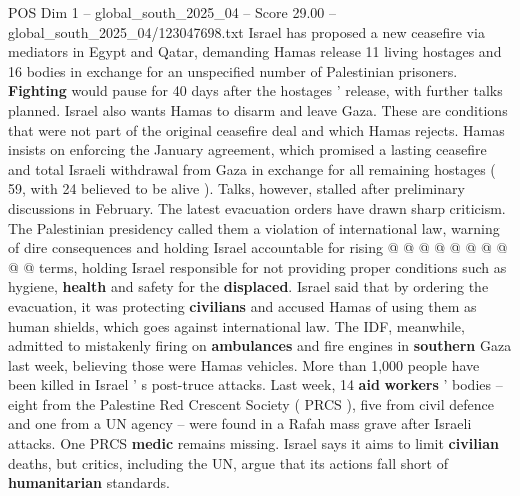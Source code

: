 \begin{textsample}{POS Dim 1 – global\_south\_2025\_04 – Score 29.00 – global\_south\_2025\_04/123047698.txt}
Israel has proposed a new ceasefire via mediators in Egypt and Qatar, demanding Hamas release 11 living hostages and 16 bodies in exchange for an unspecified number of Palestinian prisoners. \textbf{Fighting} would pause for 40 days after the hostages ' release, with further talks planned.
Israel also wants Hamas to disarm and leave Gaza.
These are conditions that were not part of the original ceasefire deal and which Hamas rejects.
Hamas insists on enforcing the January agreement, which promised a lasting ceasefire and total Israeli withdrawal from Gaza in exchange for all remaining hostages ( 59, with 24 believed to be alive ).
Talks, however, stalled after preliminary discussions in February.
The latest evacuation orders have drawn sharp criticism.
The Palestinian presidency called them a violation of international law, warning of dire consequences and holding Israel accountable for rising @ @ @ @ @ @ @ @ @ @ terms, holding Israel responsible for not providing proper conditions such as hygiene, \textbf{health} and safety for the \textbf{displaced}.
Israel said that by ordering the evacuation, it was protecting \textbf{civilians} and accused Hamas of using them as human shields, which goes against international law.
The IDF, meanwhile, admitted to mistakenly firing on \textbf{ambulances} and fire engines in \textbf{southern} Gaza last week, believing those were Hamas vehicles.
More than 1,000 people have been killed in Israel ' s post-truce attacks.
Last week, 14 \textbf{aid} \textbf{workers} ' bodies -- eight from the Palestine Red Crescent Society ( PRCS ), five from civil defence and one from a UN agency -- were found in a Rafah mass grave after Israeli attacks.
One PRCS \textbf{medic} remains missing.
Israel says it aims to limit \textbf{civilian} deaths, but critics, including the UN, argue that its actions fall short of \textbf{humanitarian} standards.

\end{textsample}
